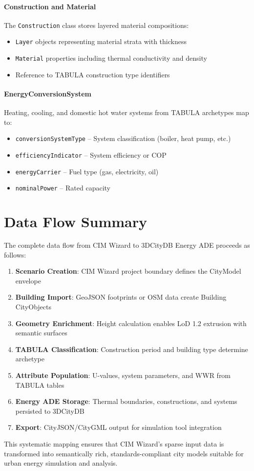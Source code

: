 \paragraph{Construction and Material}
The \texttt{Construction} class stores layered material compositions:
\begin{itemize}[leftmargin=1.2em]
    \item \texttt{Layer} objects representing material strata with thickness
    \item \texttt{Material} properties including thermal conductivity and density
    \item Reference to TABULA construction type identifiers
\end{itemize}

\paragraph{EnergyConversionSystem}
Heating, cooling, and domestic hot water systems from TABULA archetypes map to:
\begin{itemize}[leftmargin=1.2em]
    \item \texttt{conversionSystemType} -- System classification (boiler, heat pump, etc.)
    \item \texttt{efficiencyIndicator} -- System efficiency or COP
    \item \texttt{energyCarrier} -- Fuel type (gas, electricity, oil)
    \item \texttt{nominalPower} -- Rated capacity
\end{itemize}

\section{Data Flow Summary}

The complete data flow from CIM Wizard to 3DCityDB Energy ADE proceeds as follows:

\begin{enumerate}[leftmargin=1.2em]
    \item \textbf{Scenario Creation}: CIM Wizard project boundary defines the CityModel envelope
    \item \textbf{Building Import}: GeoJSON footprints or OSM data create Building CityObjects
    \item \textbf{Geometry Enrichment}: Height calculation enables LoD 1.2 extrusion with semantic surfaces
    \item \textbf{TABULA Classification}: Construction period and building type determine archetype
    \item \textbf{Attribute Population}: U-values, system parameters, and WWR from TABULA tables
    \item \textbf{Energy ADE Storage}: Thermal boundaries, constructions, and systems persisted to 3DCityDB
    \item \textbf{Export}: CityJSON/CityGML output for simulation tool integration
\end{enumerate}

This systematic mapping ensures that CIM Wizard's sparse input data is transformed into semantically rich, standards-compliant city models suitable for urban energy simulation and analysis.

